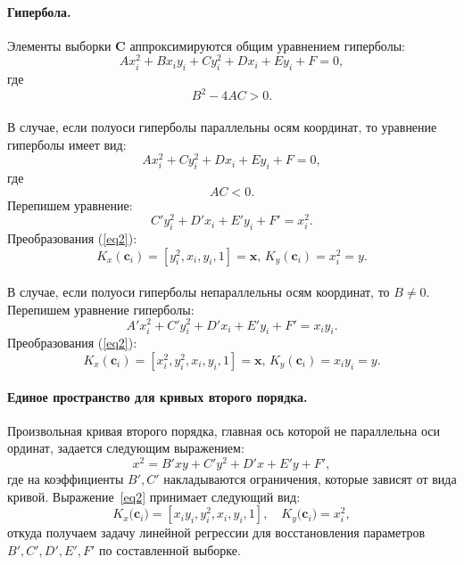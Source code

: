 \documentclass[12pt, twoside]{article}
\numberwithin{equation}{section}
\begin{document}
\paragraph{Гипербола.}
Элементы выборки $\mathbf{C}$ аппроксимируются общим уравнением гиперболы: \begin{equation} Ax_i^2 + Bx_iy_i + Cy_i^2 + Dx_i + Ey_i + F = 0,\end{equation} где \begin{equation} \label{35}
B^2 - 4AC > 0.\end{equation} \\
В случае, если полуоси гиперболы параллельны осям координат, то уравнение гиперболы имеет вид: \begin{equation}  Ax_i^2 + Cy_i^2 + Dx_i + Ey_i + F = 0,\end{equation} где \begin{equation} \label{37}
AC < 0.\end{equation} Перепишем уравнение: \begin{equation}
C'y_i^2 + D'x_i + E'y_i + F' = x_i^2.\end{equation} Преобразования (\ref{eq2}): \begin{equation}
K_{x}(\mathbf{c}_i) = [y_i^2, x_i, y_i, 1] = \mathbf{x}, \,  K_{y}(\mathbf{c}_i) = x_i^2 = y.\end{equation} \\
В случае, если полуоси гиперболы непараллельны осям координат, то $B \neq 0$. Перепишем уравнение гиперболы:\begin{equation}A'x_i^2 + C'y_i^2 + D'x_i + E'y_i + F' =  x_iy_i.\end{equation} Преобразования (\ref{eq2}): \begin{equation}
K_{x}(\mathbf{c}_i) = [x_i^2, y_i^2, x_i, y_i, 1] = \mathbf{x}, \,  K_{y}(\mathbf{c}_i) = x_iy_i = y.\end{equation} 

\paragraph{Единое пространство для кривых второго порядка.} Произвольная кривая второго порядка, главная ось которой не параллельна оси ординат, задается следующим выражением:
\[
\label{st:coef}
x^2 = B'xy+C'y^2+D'x+E'y+F',
\]
где на коэффициенты $B',C'$ накладываются ограничения, которые зависят от вида кривой. Выражение~\eqref{eq2} принимает следующий вид:
\[
\label{st:K_map}
K_x\bigr(\mathbf{c}_i\bigr)=\left[x_iy_i, y_i^2, x_i, y_i, 1\right], \quad K_y\bigr(\mathbf{c}_i\bigr)=x_i^2,
\]
откуда получаем задачу линейной регрессии для восстановления параметров~$B', C', D', E', F'$ по составленной выборке.
\end{document}
